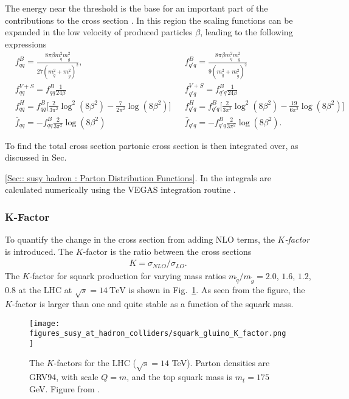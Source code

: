 \documentclass[twoside,english]{uiofysmaster}
\begin{document}
{The energy near the threshold is the base for an important part of the contributions to the cross section \cite{beenakker1997squark}. In this region the scaling functions can be expanded in the low velocity of produced particles $\beta$, leading to the following expressions \cite{beenakker1997squark}
\begin{align}
&f_{qq}^B = \frac{8 \pi \beta m_{\widetilde{q}}^2 m_{\widetilde{g}}^2}{27(m_{\widetilde{q}}^2 + m_{\widetilde{g}}^2)^2}, &&f_{q'q}^B = \frac{8 \pi \beta m_{\widetilde{q}}^2 m_{\widetilde{g}}^2}{9(m_{\widetilde{q}}^2 + m_{\widetilde{g}}^2)^2} \nonumber \\
& f_{qq}^{V+S} = f_{qq}^B \frac{1}{24 \beta} && f_{q'q}^{V+S} = f_{q'q}^B \frac{1}{24 \beta} \nonumber \\
&f_{qq}^H = f_{qq}^B \Big[\frac{2}{3 \pi^2} \log^2(8 \beta^2) - \frac{7}{2 \pi^2} \log (8 \beta^2) \Big] &&f_{q'q}^H = f_{q'q}^B \Big[\frac{2}{3 \pi^2} \log^2(8 \beta^2) - \frac{19}{6 \pi^2} \log (8 \beta^2) \Big] \nonumber \\
& \bar{f}_{qq} = - f_{qq}^B \frac{2}{3 \pi^2} \log (8 \beta^2) &&\bar{f}_{q'q} = - f_{q'q}^B \frac{2}{3 \pi^2} \log (8 \beta^2).\label{Eq:: susy hadron : Scaling functions near threshold}
\end{align}

To find the total cross section partonic cross section is then integrated over, as discussed in Sec.~{\ref{Sec:: susy hadron : Parton Distribution Functions}. In \cite{beenakker1997squark} the integrals are calculated numerically using the VEGAS integration routine \cite{PETERLEPAGE1978192}.


\subsubsection{K-Factor}

To quantify the change in the cross section from adding NLO terms, the \textit{$K$-factor} is introduced. The $K$-factor is the ratio between the cross sections
\begin{align}
K = \sigma_{NLO}/\sigma_{LO}.
\end{align}
The $K$-factor for squark production for varying mass ratios $m_{\widetilde{q}}/m_{\widetilde{g}}=2.0$, $ 1.6$, $1.2$, $0.8$ at the LHC at $\sqrt{s}=14~\mathrm{TeV}$ is shown in Fig.~\ref{Fig:: susy hadron : K-factor LHC}. As seen from the figure, the $K$-factor is larger than one and quite stable as a function of the squark mass. 

\begin{figure}
\centering
\texttt{[image: figures\_susy\_at\_hadron\_colliders/squark\_gluino\_K\_factor.png]}
\caption{The $K$-factors for the LHC ($\sqrt{s}=14$ TeV). Parton densities are GRV94, with scale $Q=m$, and the top squark mass is $m_t=175$ GeV. Figure from \cite{beenakker1997squark}.}
\label{Fig:: susy hadron : K-factor LHC}
\end{figure}


}}
\end{document}
